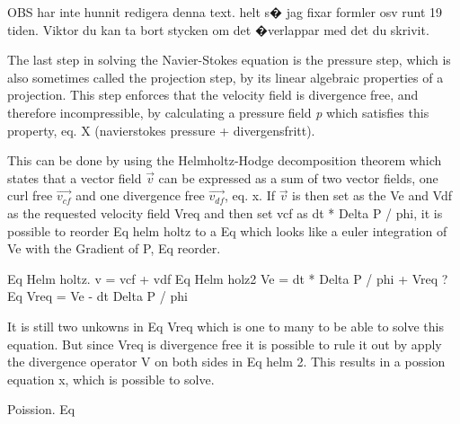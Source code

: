 OBS har inte hunnit redigera denna text. helt s� jag fixar formler osv runt 19 tiden. Viktor du kan ta bort stycken om det �verlappar med det du skrivit.

The last step in solving the Navier-Stokes equation is the pressure step, which is also sometimes called the projection step, by its linear algebraic properties of a projection. This step enforces that the velocity field is divergence free, and therefore incompressible, by calculating a pressure field \emph{p} which satisfies this property, eq. X (navierstokes pressure + divergensfritt). 

This can be done by using the Helmholtz-Hodge decomposition theorem which states that a vector field $\vec{v}$ can be expressed as a sum of two vector fields, one curl free $\vec{v_{cf}}$ and one divergence free $\vec{v_{df}}$, eq. x. If $\vec{v}$ is then set as the Ve and Vdf as the requested velocity field Vreq and then set vcf as dt * Delta P / phi, it is possible to reorder Eq helm holtz to a Eq which looks like a euler integration of Ve with the Gradient of P, Eq reorder. 

Eq Helm holtz. v = vcf  + vdf
Eq Helm holz2 Ve = dt * Delta P / phi + Vreq ? 
Eq Vreq = Ve - dt Delta P / phi

It is still two unkowns in Eq Vreq which is one to many to be able to solve this equation. But since Vreq is divergence free it is possible to rule it out by apply the divergence operator V on both sides in Eq helm 2. This results in a possion equation x, which is possible to solve. 

Poission. Eq

